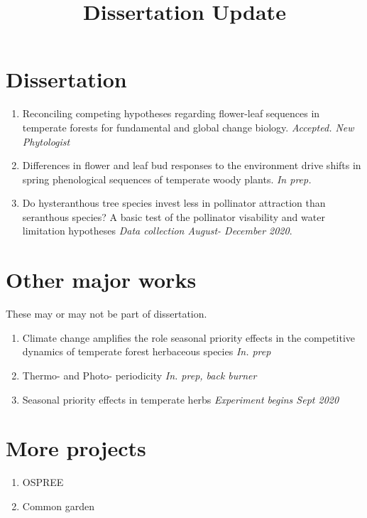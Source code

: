 \documentclass[12pt]{article}
\title{Dissertation Update}
\begin{document}
\maketitle
\section*{Dissertation}
\begin{enumerate}
\item Reconciling competing hypotheses regarding flower-leaf sequences in temperate forests for fundamental and global change biology. \emph{Accepted. New Phytologist}
\item Differences in flower and leaf bud responses to the environment drive shifts in spring phenological sequences of temperate woody plants. \emph{In prep.}
\item Do hysteranthous tree species invest less in pollinator attraction than seranthous species? A basic test of the pollinator visability and water limitation hypotheses \emph{Data collection August- December 2020}. 
\end{enumerate}

\section*{Other major works}
These may or may not be part of dissertation.
\begin{enumerate}
\item Climate change amplifies the role seasonal priority effects in the competitive dynamics of temperate forest herbaceous species \emph{In. prep}
\item Thermo- and Photo- periodicity \emph{In. prep, back burner}
\item Seasonal priority effects in temperate herbs \emph{Experiment begins Sept 2020}
\end{enumerate}

\section*{More projects}
\begin{enumerate}
\item OSPREE
\item Common garden
\end{enumerate}
\end{document}
